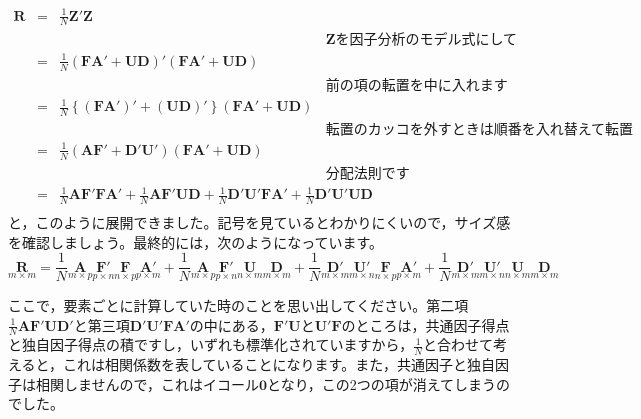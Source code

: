 \documentclass{ltjsbook}
\begin{document}
\begin{equation}
\begin{array}{lll}
\bm{R} &=& \frac{1}{N} \bm{Z}'\bm{Z} \\
&&\hspace{8cm}\text{$\bm{Z}$を因子分析のモデル式にして}\\
&=& \frac{1}{N}(\bm{F} \bm{A} ' + \bm{U} \bm{D})'(\bm{F} \bm{A} ' + \bm{U} \bm{D})\\
&&\hspace{8cm}\text{前の項の転置を中に入れます}\\
&=& \frac{1}{N}\left \{ (\bm{F} \bm{A} ')'+(\bm{U} \bm{D})' \right \}(\bm{F} \bm{A} ' + \bm{U} \bm{D})\\
&&\hspace{8cm}\text{転置のカッコを外すときは順番を入れ替えて転置}\\
&=& \frac{1}{N}(\bm{A} \bm{F} ' + \bm{D}' \bm{U} ')(\bm{F} \bm{A} ' + \bm{U} \bm{D})\\
&&\hspace{8cm}\text{分配法則です}\\
&=& \frac{1}{N}\bm{A} \bm{F}' \bm{F} \bm{A}' + \frac{1}{N} \bm{A} \bm{F}' \bm{U} \bm{D} + \frac{1}{N} \bm{D}' \bm{U} ' \bm{F} \bm{A} ' + \frac{1}{N} \bm{D}' \bm{U}' \bm{U} \bm{D} \\
\end{array}
\end{equation}
と，このように展開できました。記号を見ているとわかりにくいので，サイズ感を確認しましょう。最終的には，次のようになっています。
\[
\underset{m \times m}{\bm{R}} =
 \frac{1}{N} \underset{m \times p}{\bm{A}} \underset{p \times n}{\bm{F}'} \underset{n \times p}{\bm{F}} \underset{p \times m}{\bm{A}'} +
 \frac{1}{N} \underset{m \times p}{\bm{A}} \underset{p \times n}{\bm{F}'} \underset{n \times m}{\bm{U}} \underset{m \times m}{\bm{D}} +
  \frac{1}{N} \underset{m \times m}{\bm{D}'} \underset{m \times n}{\bm{U}'} \underset{n \times p}{\bm{F}} \underset{p \times m}{\bm{A}'} +
 \frac{1}{N} \underset{m \times m}{\bm{D}'} \underset{m \times n}{\bm{U}'} \underset{n \times m}{\bm{U}} \underset{m \times m}{\bm{D}} 
\]

ここで，要素ごとに計算していた時のことを思い出してください。第二項$\frac{1}{N} \bm{A} \bm{F}'\bm{U} \bm{D}'$と第三項$\bm{D}' \bm{U}' \bm{F} \bm{A}'$の中にある，$\bm{F}' \bm{U}$と$\bm{U}' \bm{F}$のところは，共通因子得点と独自因子得点の積ですし，いずれも標準化されていますから，$\frac{1}{N}$と合わせて考えると，これは相関係数を表していることになります。また，共通因子と独自因子は相関しませんので，これはイコール$\bm{0}$となり，この2つの項が消えてしまうのでした。
\end{document}
